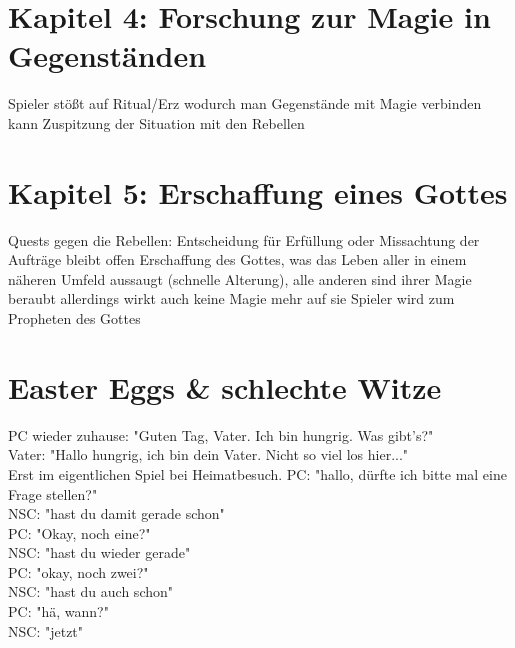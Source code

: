 \section{Kapitel 4: Forschung zur Magie in Gegenständen}
\begin{outline}
	\1 Spieler stößt auf Ritual/Erz wodurch man Gegenstände mit Magie verbinden kann
	\1 Zuspitzung der Situation mit den Rebellen
\end{outline}




\section{Kapitel 5: Erschaffung eines Gottes}
\begin{outline}
	\1 Quests gegen die Rebellen: Entscheidung für Erfüllung oder Missachtung der Aufträge bleibt offen
	\1 Erschaffung des Gottes, was das Leben aller in einem näheren Umfeld aussaugt (schnelle Alterung), alle anderen sind ihrer Magie beraubt allerdings wirkt auch keine Magie mehr auf sie
	\1 Spieler wird zum Propheten des Gottes
\end{outline}




\section{Easter Eggs \& schlechte Witze}
\begin{outline}
	\1 PC wieder zuhause: "Guten Tag, Vater. Ich bin hungrig. Was gibt's?" \\ Vater: "Hallo hungrig, ich bin dein Vater. Nicht so viel los hier..." \\ Erst im eigentlichen Spiel bei Heimatbesuch.
	\1  PC: "hallo, dürfte ich bitte mal eine Frage stellen?" \\ NSC: "hast du damit gerade schon" \\ PC: "Okay, noch eine?" \\ NSC: "hast  du wieder gerade" \\ PC: "okay, noch zwei?" \\ NSC: "hast du auch schon" \\ PC: "hä, wann?" \\ NSC: "jetzt"
\end{outline}
